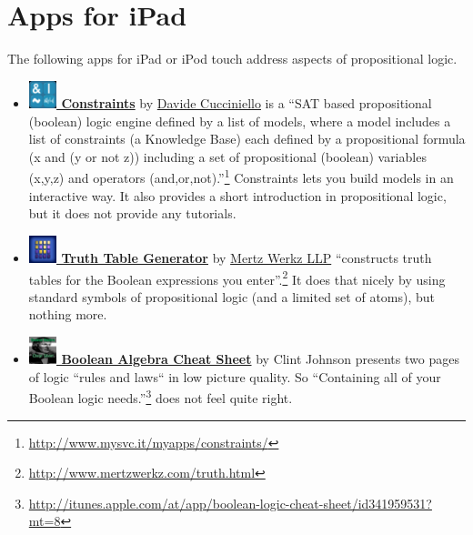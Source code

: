 \section{Apps for iPad}
 
The following apps for iPad or iPod touch address aspects of propositional logic.

\begin{itemize}

\item  \href{http://itunes.apple.com/at/app/constraints/id418722652?mt=8}{\bf 
\includegraphics[width=0.8cm]{related/Constraints.png} Constraints}
by 
\href{http://www.mysvc.it/myapps/constraints/}{Davide Cucciniello} 
is a “SAT based propositional (boolean) logic engine defined by a list of models, 
where a model includes a list of constraints (a Knowledge Base) 
each defined by a propositional formula (x and (y or not z)) 
including a set of propositional (boolean) variables (x,y,z) 
and operators (and,or,not).”\footnote{
\url{http://www.mysvc.it/myapps/constraints/}} Constraints
lets you build models in an interactive way. 
It also provides a short introduction in propositional logic, 
but it does not provide any tutorials.


\item \href{http://itunes.apple.com/at/app/truth-table-generator/id507190346?mt=8}{\bf 
\includegraphics[width=0.8cm]{related/TruthTables.png} Truth Table Generator} 
by
\href{http://www.mertzwerkz.com/truth.html}{Mertz Werkz LLP}    
“constructs truth tables for the Boolean expressions you enter”.\footnote{
\url{http://www.mertzwerkz.com/truth.html}}
It does that nicely by using standard symbols of propositional logic (and a limited set of atoms), but nothing more.

\item
\href{http://itunes.apple.com/at/app/boolean-logic-cheat-sheet/id341959531?mt=8}{\bf 
\includegraphics[width=0.8cm]{related/CheatSheet.png} Boolean Algebra Cheat Sheet} 
by 
{Clint Johnson} presents two pages of logic “rules and laws“ in low picture quality. So “Containing all of your Boolean 
logic needs.”\footnote{
\url{http://itunes.apple.com/at/app/boolean-logic-cheat-sheet/id341959531?mt=8}} 
does not feel quite right.


\end{itemize}
